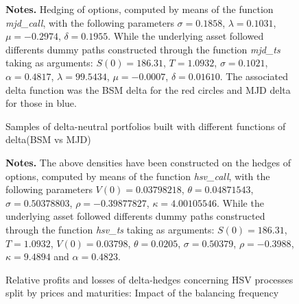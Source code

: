 \documentclass[12pt,a4paper]{report}
\begin{document}
\begin{appendices}


\begin{figure}[h]
  \centering
  
  \caption{Samples of delta-neutral portfolios built with different functions of delta(BSM vs MJD)}
  \begin{changemargin}{0.5cm}{0.5cm}
  \medskip
\footnotesize
{}\textbf{Notes.} Hedging of options, computed by means of the function \textit{mjd\_call}, with the following parameters $\sigma = 0.1858$, $\lambda = 0.1031$, $\mu = -0.2974$, $\delta = 0.1955$. While the underlying asset followed differents dummy paths constructed through the function \textit{mjd\_ts} taking as arguments: $S(0) = 186.31$, $T = 1.0932$, $\sigma = 0.1021$, $\alpha = 0.4817$, $\lambda = 99.5434$, $\mu = -0.0007$, $\delta = 0.01610$. The associated delta function was the BSM delta for the red circles and MJD delta for those in blue.
  \end{changemargin}
  \label{p:analysis:mjd:hedge:deltas}
\end{figure}






\begin{figure}[h]
  \centering
  
  \caption{Relative profits and losses of delta-hedges concerning HSV processes split by prices and maturities: Impact of the balancing frequency}
  \begin{changemargin}{0.5cm}{0.5cm}
  \medskip
\footnotesize
{}\textbf{Notes.} The above densities have been constructed on the hedges of options, computed by means of the function \textit{hsv\_call}, with the following parameters $V(0) = 0.03798218$, $\theta = 0.04871543$, $\sigma = 0.50378803$, $\rho = -0.39877827$, $\kappa = 4.00105546$. While the underlying asset followed differents dummy paths constructed through the function \textit{hsv\_ts} taking as arguments: $S(0) = 186.31$, $T = 1.0932$, $V(0) = 0.03798$, $\theta = 0.0205$, $\sigma = 0.50379$, $\rho = -0.3988$,  $\kappa = 9.4894$ and $\alpha  = 0.4823$. 
  \end{changemargin}
  \label{p:analysis:hsv:pl:dist:big}
\end{figure}







\end{appendices}
\end{document}
